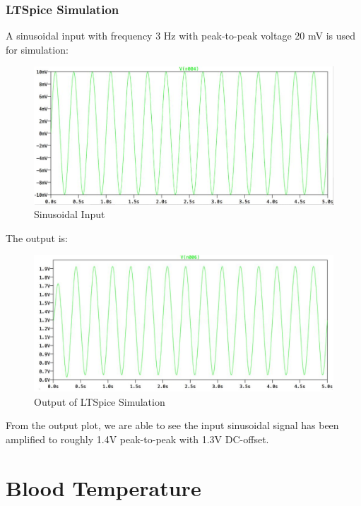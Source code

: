 \subsubsection{LTSpice Simulation}

A sinusoidal input with frequency 3 Hz with peak-to-peak voltage 20 mV is used for simulation:

\begin{figure}[H]
	\centering
	\includegraphics[width=\linewidth]{georgepic6.jpg}
	\caption{Sinusoidal Input}
\end{figure}

The output is:

\begin{figure}[H]
	\centering
	\includegraphics[width=\linewidth]{georgepic7.jpg}
	\caption{Output of LTSpice Simulation}
\end{figure}

From the output plot, we are able to see the input sinusoidal signal has been amplified to roughly 1.4V peak-to-peak with 1.3V DC-offset.







\section{Blood Temperature}

